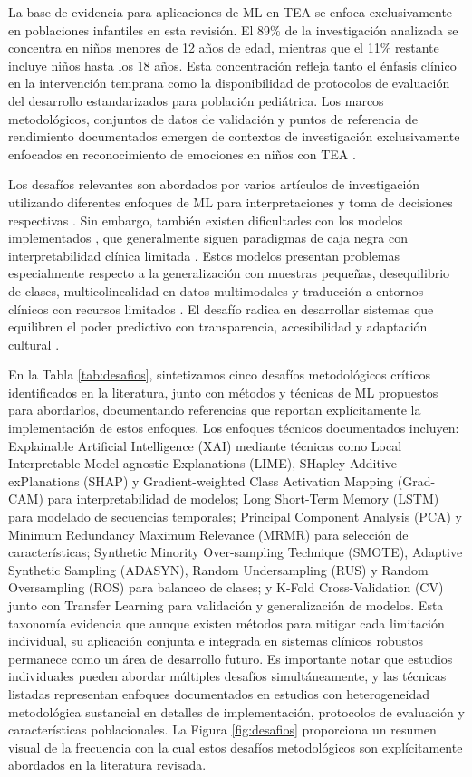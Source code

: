 \documentclass{ieeeaccess}
\begin{document}
	La base de evidencia para aplicaciones de ML en TEA se enfoca exclusivamente en poblaciones infantiles en esta revisión. El 89\% de la investigación analizada se concentra en niños menores de 12 años de edad, mientras que el 11\% restante incluye niños hasta los 18 años. Esta concentración refleja tanto el énfasis clínico en la intervención temprana como la disponibilidad de protocolos de evaluación del desarrollo estandarizados para población pediátrica. Los marcos metodológicos, conjuntos de datos de validación y puntos de referencia de rendimiento documentados emergen de contextos de investigación exclusivamente enfocados en reconocimiento de emociones en niños con TEA \cite{b1}.
	
	Los desafíos relevantes son abordados por varios artículos de investigación utilizando diferentes enfoques de ML para interpretaciones y toma de decisiones respectivas \cite{b8}. Sin embargo, también existen dificultades con los modelos implementados \cite{b1,b10}, que generalmente siguen paradigmas de caja negra con interpretabilidad clínica limitada \cite{b14}. Estos modelos presentan problemas especialmente respecto a la generalización con muestras pequeñas, desequilibrio de clases, multicolinealidad en datos multimodales y traducción a entornos clínicos con recursos limitados \cite{b11}. El desafío radica en desarrollar sistemas que equilibren el poder predictivo con transparencia, accesibilidad y adaptación cultural \cite{b4,b5}.
	
	En la Tabla \ref{tab:desafios}, sintetizamos cinco desafíos metodológicos críticos identificados en la literatura, junto con métodos y técnicas de ML propuestos para abordarlos, documentando referencias que reportan explícitamente la implementación de estos enfoques. Los enfoques técnicos documentados incluyen: Explainable Artificial Intelligence (XAI) mediante técnicas como Local Interpretable Model-agnostic Explanations (LIME), SHapley Additive exPlanations (SHAP) y Gradient-weighted Class Activation Mapping (Grad-CAM) para interpretabilidad de modelos; Long Short-Term Memory (LSTM) para modelado de secuencias temporales; Principal Component Analysis (PCA) y Minimum Redundancy Maximum Relevance (MRMR) para selección de características; Synthetic Minority Over-sampling Technique (SMOTE), Adaptive Synthetic Sampling (ADASYN), Random Undersampling (RUS) y Random Oversampling (ROS) para balanceo de clases; y K-Fold Cross-Validation (CV) junto con Transfer Learning para validación y generalización de modelos. Esta taxonomía evidencia que aunque existen métodos para mitigar cada limitación individual, su aplicación conjunta e integrada en sistemas clínicos robustos permanece como un área de desarrollo futuro. Es importante notar que estudios individuales pueden abordar múltiples desafíos simultáneamente, y las técnicas listadas representan enfoques documentados en estudios con heterogeneidad metodológica sustancial en detalles de implementación, protocolos de evaluación y características poblacionales. La Figura \ref{fig:desafios} proporciona un resumen visual de la frecuencia con la cual estos desafíos metodológicos son explícitamente abordados en la literatura revisada.
	
\end{document}
